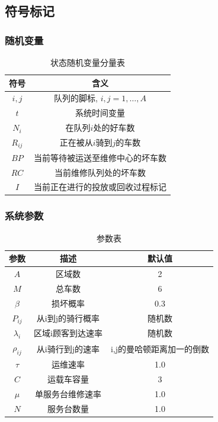 \documentclass{article}
\begin{document}
\subsection{符号标记}

\subsubsection{随机变量}
\begin{table}[H]
    \centering
    \caption{状态随机变量分量表}
    \begin{tabular}{ |c|c| } 
     \hline
     符号 & 含义 \\ 
     \hline
     $i, j$ & 队列的脚标, $i,j = 1, \dots, A$ \\ 
     \hline
     $t$ & 系统时间变量\\ 
     \hline
     $N_i$ & 在队列$i$处的好车数\\
     \hline
     $R_{ij}$ & 正在被从$i$骑到$j$的车数 \\ 
     \hline
     $BP$ & 当前等待被运送至维修中心的坏车数 \\
     \hline
     $RC$ & 当前维修队列处的坏车数 \\
     \hline
     $I$ & 当前正在进行的投放或回收过程标记 \\
     \hline
    \end{tabular}
    \label{tab:rv}
\end{table}

\subsubsection{系统参数}
\begin{table}[H]
    \centering
    \caption{参数表}
    \begin{tabular}{ |c|c|c| } 
     \hline
     参数 & 描述 & 默认值 \\ 
     \hline
     $A$ & 区域数 & 2 \\ 
     \hline
     $M$ & 总车数 & 6 \\ 
     \hline
     $\beta$ & 损坏概率 & 0.3 \\
     \hline
     $P_{ij}$ & 从i到j的骑行概率 & 随机数 \\
     \hline
     $\lambda_i$ & 区域i顾客到达速率 & 随机数 \\
     \hline
     $\rho_{ij}$ & 从i骑行到j的速率 & i,j的曼哈顿距离加一的倒数 \\
     \hline
     $\tau$ & 运维速率 & 1.0 \\
     \hline
     $C$ & 运载车容量 & 3 \\
     \hline
     $\mu$ & 单服务台维修速率 & 1.0 \\
     \hline
     $N$ & 服务台数量 & 1.0 \\
     \hline
    \end{tabular}
    \label{tab:para}
\end{table}
\end{document}

